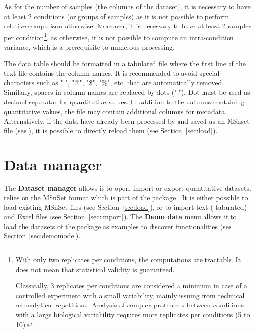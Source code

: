 \documentclass[12pt]{article}
\begin{document}
As for the number of samples (the columns of the dataset), it is necessary to have at least 2 conditions (or groups of samples) as it is not possible to perform relative comparison otherwise. Moreover, it is necessary to have at least 2 samples per condition\footnote{With only two replicates per conditions, the computations are tractable. It does not mean that statistical validity is guaranteed. 

Classically, 3 replicates per conditions are considered a minimum in case of a controlled experiment with a small variability, mainly issuing from technical or analytical repetitions. Analysis of complex proteomes between conditions with a large biological variability requires more replicates per conditions (5 to 10).}, as otherwise, it is not possible to compute an intra-condition variance, which is a prerequisite to numerous processing. 

The data table should be formatted in a tabulated file where the first line of the text file contains the column names. It is recommended to avoid special characters such as "]", "@", "\$", "\%", etc. that are automatically removed. Similarly, spaces in column names are replaced by dots ("."). Dot must be used as decimal separator for quantitative values. In addition to the columns containing quantitative values, the file may contain additional columns for metadata. Alternatively, if the data have already been processed by  and saved as an MSnset file (see ), it is possible to directly reload them (see Section~\ref{sec:load}). 

\section{Data manager}\label{sec:manager}
The \textbf{Dataset manager} allows it to open, import or export quantitative 
datasets.  relies on the MSnSet format which 
is part of the package :
It is either possible to load existing MSnSet files (see 
Section~\ref{sec:load}), or to import text (-tabulated) and Excel files (see 
Section~\ref{sec:import}). The \textbf{Demo data} menu allows it to load 
the datasets of the package  as examples to discover
 functionalities (see Section~\ref{sec:demomode}).
\end{document}
